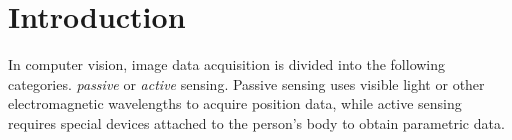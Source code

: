\section{Introduction}
In computer vision, image data acquisition is divided into the following categories. \emph{passive} or \emph{active} sensing. Passive sensing uses visible light or other electromagnetic wavelengths to acquire position data, while active sensing requires special devices attached to the person's body to obtain parametric data. 